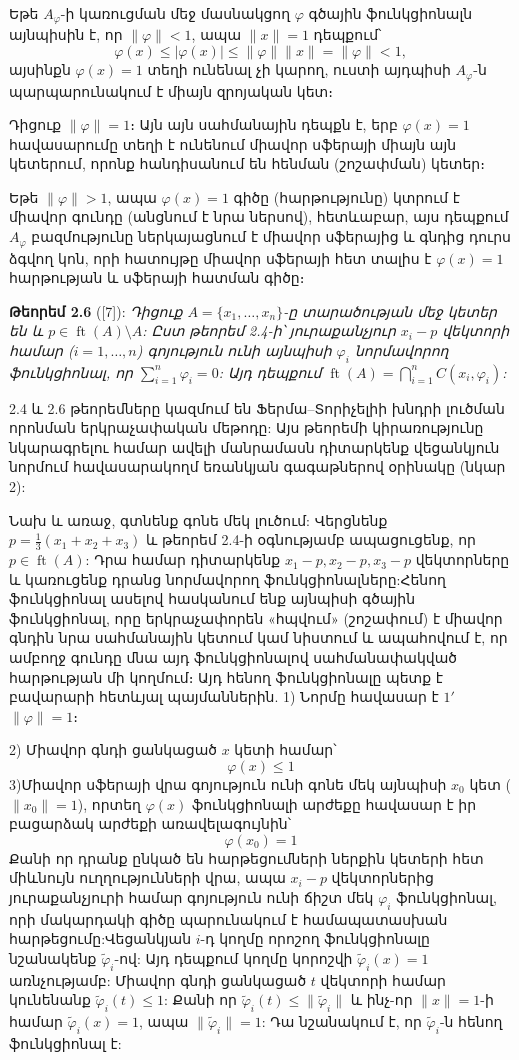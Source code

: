 \documentclass[12pt,a4paper]{article}
\numberwithin{equation}{section}
\numberwithin{figure}{section}
\begin{document}
Եթե $A_\varphi$-ի կառուցման մեջ մասնակցող $\varphi$ գծային ֆունկցիոնալն այնպիսին է, որ $\|\varphi\| < 1$, ապա $\|x\| = 1$ դեպքում՝
$$\varphi(x) \le |\varphi(x)| \le \|\varphi\| \|x\| = \|\varphi\| < 1,$$
այսինքն $\varphi(x) = 1$ տեղի ունենալ չի կարող, ուստի այդպիսի $A_\varphi$-ն պարպարունակում է միայն զրոյական կետ։

Դիցուք $\|\varphi\| = 1$։ Այն այն սահմանային դեպքն է, երբ $\varphi(x) = 1$ հավասարումը տեղի է ունենում միավոր սֆերայի միայն այն կետերում, որոնք հանդիսանում են հենման (շոշափման) կետեր։

Եթե $\|\varphi\| > 1$, ապա $\varphi(x) = 1$ գիծը (հարթությունը) կտրում է միավոր գունդը (անցնում է նրա ներսով), հետևաբար, այս դեպքում $A_\varphi$ բազմությունը ներկայացնում է միավոր սֆերայից և գնդից դուրս ձգվող կոն, որի հատույթը միավոր սֆերայի հետ տալիս է $\varphi(x) = 1$ հարթության և սֆերայի հատման գիծը։


\textbf{Թեորեմ 2.6} ([7]): \textit{Դիցուք $A = \{x_1, \dots, x_n\}$-ը տարածության մեջ կետեր են և $p \in \operatorname{ft}(A) \setminus A$: Ըստ թեորեմ 2.4-ի՝ յուրաքանչյուր $x_i - p$ վեկտորի համար ($i = 1, \dots, n$) գոյություն ունի այնպիսի $\varphi_i$ նորմավորող ֆունկցիոնալ, որ $\sum_{i=1}^n \varphi_i = 0$: Այդ դեպքում $\operatorname{ft}(A) = \bigcap_{i=1}^n C(x_i, \varphi_i)$:}

2.4 և 2.6 թեորեմները կազմում են Ֆերմա--Տորիչելիի խնդրի լուծման որոնման երկրաչափական մեթոդը: Այս թեորեմի կիրառությունը նկարագրելու համար ավելի մանրամասն դիտարկենք վեցանկյուն նորմում հավասարակողմ եռանկյան գագաթներով օրինակը (նկար 2):

Նախ և առաջ, գտնենք գոնե մեկ լուծում: Վերցնենք $p = \frac{1}{3}(x_1 + x_2 + x_3)$ և թեորեմ 2.4-ի օգնությամբ ապացուցենք, որ $p \in \operatorname{ft}(A)$: Դրա համար դիտարկենք $x_1 - p, x_2 - p, x_3 - p$ վեկտորները և կառուցենք դրանց նորմավորող ֆունկցիոնալները:Հենող ֆունկցիոնալ ասելով հասկանում ենք այնպիսի գծային ֆունկցիոնալ, որը երկրաչափորեն «հպվում» (շոշափում) է միավոր գնդին նրա սահմանային կետում կամ նիստում և ապահովում է, որ ամբողջ գունդը մնա այդ ֆունկցիոնալով սահմանափակված հարթության մի կողմում։ Այդ հենող ֆունկցիոնալը պետք է բավարարի հետևյալ պայմաններին.
1) Նորմը հավասար է $1'$ $\|\varphi\| = 1$։

2) Միավոր գնդի ցանկացած $x$ կետի համար՝$$\varphi(x) \leq 1$$ 
3)Միավոր սֆերայի վրա գոյություն ունի գոնե մեկ այնպիսի $x_0$ կետ ($\|x_0\|=1$), որտեղ $\varphi(x)$ ֆունկցիոնալի արժեքը հավասար է իր բացարձակ արժեքի առավելագույնին՝
$$\varphi(x_0) = 1$$
Քանի որ դրանք ընկած են հարթեցումների ներքին կետերի հետ միևնույն ուղղությունների վրա, ապա $x_i - p$ վեկտորներից յուրաքանչյուրի համար գոյություն ունի ճիշտ մեկ $\varphi_i$ ֆունկցիոնալ, որի մակարդակի գիծը պարունակում է համապատասխան հարթեցումը:Վեցանկյան $i$-դ կողմը որոշող ֆունկցիոնալը նշանակենք $\tilde{\varphi}_i$-ով: Այդ դեպքում կողմը կորոշվի $\tilde{\varphi}_i(x) = 1$ առնչությամբ: Միավոր գնդի ցանկացած $t$ վեկտորի համար կունենանք $\tilde{\varphi}_i(t) \leq 1$: Քանի որ $\tilde{\varphi}_i(t) \leq \|\tilde{\varphi}_i\|$ և ինչ-որ $\|x\| = 1$-ի համար $\tilde{\varphi}_i(x) = 1$, ապա $\|\tilde{\varphi}_i\| = 1$: Դա նշանակում է, որ $\tilde{\varphi}_i$-ն հենող ֆունկցիոնալ է:
\end{document}
